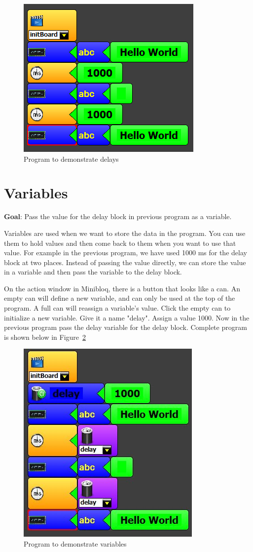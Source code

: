 \begin{figure}[h]
\centering
\includegraphics[width=0.6\columnwidth]{Images/Manual/lesson_2}
\caption{Program to demonstrate delays}
\label{fig:lesson_2}
\end{figure}

\section{Variables}

\textbf{Goal}: Pass the value for the delay block in previous program as a variable.

Variables are used when we want to store the data in the program. You can use them to hold values and then come back to them when you want to use that value. For example in the previous program, we have used 1000 ms for the delay block at two places. Instead of passing the value directly, we can store the value in a variable and then pass the variable to the delay block.

On the action window in Minibloq, there is a button that looks like a can. An empty can will define a new variable, and can only be used at the top of the program. A full can will reassign a variable's value. Click the empty can to initialize a new variable. Give it a name "delay". Assign a value 1000. Now in the previous program pass the delay variable for the delay block. Complete program is shown below in Figure~\ref{fig:lesson_3}

\begin{figure}[h]
\centering
\includegraphics[width=0.4\columnwidth]{Images/Manual/lesson_3}
\caption{Program to demonstrate variables}
\label{fig:lesson_3}
\end{figure}


